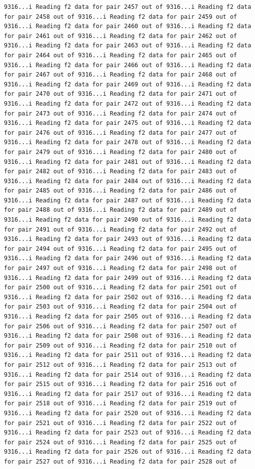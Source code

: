 \documentclass[
]{article}
\begin{document}
\begin{verbatim}
9316...i Reading f2 data for pair 2457 out of 9316...i Reading f2 data for pair 2458 out of 9316...i Reading f2 data for pair 2459 out of 9316...i Reading f2 data for pair 2460 out of 9316...i Reading f2 data for pair 2461 out of 9316...i Reading f2 data for pair 2462 out of 9316...i Reading f2 data for pair 2463 out of 9316...i Reading f2 data for pair 2464 out of 9316...i Reading f2 data for pair 2465 out of 9316...i Reading f2 data for pair 2466 out of 9316...i Reading f2 data for pair 2467 out of 9316...i Reading f2 data for pair 2468 out of 9316...i Reading f2 data for pair 2469 out of 9316...i Reading f2 data for pair 2470 out of 9316...i Reading f2 data for pair 2471 out of 9316...i Reading f2 data for pair 2472 out of 9316...i Reading f2 data for pair 2473 out of 9316...i Reading f2 data for pair 2474 out of 9316...i Reading f2 data for pair 2475 out of 9316...i Reading f2 data for pair 2476 out of 9316...i Reading f2 data for pair 2477 out of 9316...i Reading f2 data for pair 2478 out of 9316...i Reading f2 data for pair 2479 out of 9316...i Reading f2 data for pair 2480 out of 9316...i Reading f2 data for pair 2481 out of 9316...i Reading f2 data for pair 2482 out of 9316...i Reading f2 data for pair 2483 out of 9316...i Reading f2 data for pair 2484 out of 9316...i Reading f2 data for pair 2485 out of 9316...i Reading f2 data for pair 2486 out of 9316...i Reading f2 data for pair 2487 out of 9316...i Reading f2 data for pair 2488 out of 9316...i Reading f2 data for pair 2489 out of 9316...i Reading f2 data for pair 2490 out of 9316...i Reading f2 data for pair 2491 out of 9316...i Reading f2 data for pair 2492 out of 9316...i Reading f2 data for pair 2493 out of 9316...i Reading f2 data for pair 2494 out of 9316...i Reading f2 data for pair 2495 out of 9316...i Reading f2 data for pair 2496 out of 9316...i Reading f2 data for pair 2497 out of 9316...i Reading f2 data for pair 2498 out of 9316...i Reading f2 data for pair 2499 out of 9316...i Reading f2 data for pair 2500 out of 9316...i Reading f2 data for pair 2501 out of 9316...i Reading f2 data for pair 2502 out of 9316...i Reading f2 data for pair 2503 out of 9316...i Reading f2 data for pair 2504 out of 9316...i Reading f2 data for pair 2505 out of 9316...i Reading f2 data for pair 2506 out of 9316...i Reading f2 data for pair 2507 out of 9316...i Reading f2 data for pair 2508 out of 9316...i Reading f2 data for pair 2509 out of 9316...i Reading f2 data for pair 2510 out of 9316...i Reading f2 data for pair 2511 out of 9316...i Reading f2 data for pair 2512 out of 9316...i Reading f2 data for pair 2513 out of 9316...i Reading f2 data for pair 2514 out of 9316...i Reading f2 data for pair 2515 out of 9316...i Reading f2 data for pair 2516 out of 9316...i Reading f2 data for pair 2517 out of 9316...i Reading f2 data for pair 2518 out of 9316...i Reading f2 data for pair 2519 out of 9316...i Reading f2 data for pair 2520 out of 9316...i Reading f2 data for pair 2521 out of 9316...i Reading f2 data for pair 2522 out of 9316...i Reading f2 data for pair 2523 out of 9316...i Reading f2 data for pair 2524 out of 9316...i Reading f2 data for pair 2525 out of 9316...i Reading f2 data for pair 2526 out of 9316...i Reading f2 data for pair 2527 out of 9316...i Reading f2 data for pair 2528 out of 
\end{verbatim}
\end{document}
